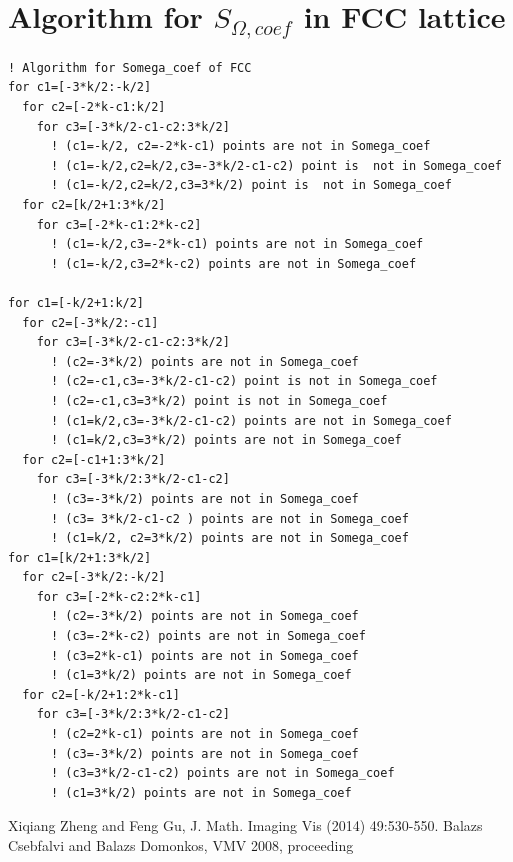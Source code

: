 \documentclass[10pt]{book}
\begin{document}
\section{Algorithm for $S_{\Omega,coef}$ in FCC lattice} 
\begin{lstlisting}[frame=single]
! Algorithm for Somega_coef of FCC
for c1=[-3*k/2:-k/2]
  for c2=[-2*k-c1:k/2]
    for c3=[-3*k/2-c1-c2:3*k/2]
      ! (c1=-k/2, c2=-2*k-c1) points are not in Somega_coef
      ! (c1=-k/2,c2=k/2,c3=-3*k/2-c1-c2) point is  not in Somega_coef
      ! (c1=-k/2,c2=k/2,c3=3*k/2) point is  not in Somega_coef
  for c2=[k/2+1:3*k/2]
    for c3=[-2*k-c1:2*k-c2]
      ! (c1=-k/2,c3=-2*k-c1) points are not in Somega_coef
      ! (c1=-k/2,c3=2*k-c2) points are not in Somega_coef
      
for c1=[-k/2+1:k/2]
  for c2=[-3*k/2:-c1]
    for c3=[-3*k/2-c1-c2:3*k/2]
      ! (c2=-3*k/2) points are not in Somega_coef
      ! (c2=-c1,c3=-3*k/2-c1-c2) point is not in Somega_coef
      ! (c2=-c1,c3=3*k/2) point is not in Somega_coef
      ! (c1=k/2,c3=-3*k/2-c1-c2) points are not in Somega_coef
      ! (c1=k/2,c3=3*k/2) points are not in Somega_coef      
  for c2=[-c1+1:3*k/2]
    for c3=[-3*k/2:3*k/2-c1-c2]
      ! (c3=-3*k/2) points are not in Somega_coef
      ! (c3= 3*k/2-c1-c2 ) points are not in Somega_coef    
      ! (c1=k/2, c2=3*k/2) points are not in Somega_coef  
for c1=[k/2+1:3*k/2]
  for c2=[-3*k/2:-k/2]
    for c3=[-2*k-c2:2*k-c1]
      ! (c2=-3*k/2) points are not in Somega_coef 
      ! (c3=-2*k-c2) points are not in Somega_coef 
      ! (c3=2*k-c1) points are not in Somega_coef 
      ! (c1=3*k/2) points are not in Somega_coef 
  for c2=[-k/2+1:2*k-c1]
    for c3=[-3*k/2:3*k/2-c1-c2]
      ! (c2=2*k-c1) points are not in Somega_coef 
      ! (c3=-3*k/2) points are not in Somega_coef 
      ! (c3=3*k/2-c1-c2) points are not in Somega_coef 
      ! (c1=3*k/2) points are not in Somega_coef 
\end{lstlisting}



 
\begin{thebibliography}{1}

	 Xiqiang Zheng and Feng Gu, J. Math. Imaging Vis (2014) 49:530-550.
		Balazs Csebfalvi and Balazs Domonkos, VMV 2008, proceeding
	
\end{thebibliography}


 
\end{document}

